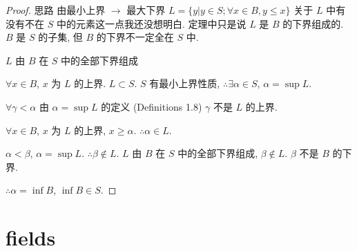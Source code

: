     \begin{proof}
思路 由最小上界 $\rightarrow $ 最大下界
$L = \{y| y\in S; \forall x\in B, y\leq x\}$
    关于 $L$ 中有没有不在 $S$ 中的元素这一点我还没想明白. 定理中只是说 $L$ 是 $B$ 的下界组成的. $B$ 是 $S$ 的子集, 但 $B$ 的下界不一定全在 $S$ 中. 

$L$ 由 $B$ 在 $S$ 中的全部下界组成

$\forall x\in B$, $x$ 为 $L$ 的上界. $L\subset S$.
$S$ 有最小上界性质,
$\therefore \exists \alpha\in S$, $\alpha = \sup L$.

$\forall \gamma <\alpha$ 由 $\alpha = \sup L$ 的定义 (Definitions 1.8)
$\gamma$ 不是 $L$ 的上界.

$\forall x \in B$, $x$ 为 $L$ 的上界, $x \geq \alpha$. $\therefore \alpha \in L$.

$\alpha < \beta$, $\alpha = \sup L$. $\therefore \beta \not\in L$.
$L$ 由 $B$ 在 $S$ 中的全部下界组成, $\beta \not\in L$.
$\beta$ 不是 $B$ 的下界.

$\therefore \alpha = \inf B$, $\inf B\in S$.
    \end{proof}


\section{fields}

